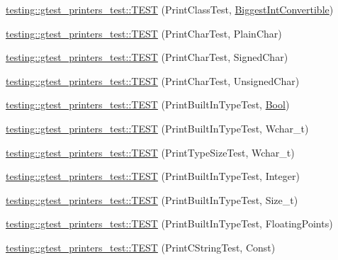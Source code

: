 \begin{DoxyCompactItemize}
\item 
\mbox{\hyperlink{namespacetesting_1_1gtest__printers__test_a46ee2873cfeb51db5f56be0960ce333b}{testing\+::gtest\+\_\+printers\+\_\+test\+::\+T\+E\+ST}} (Print\+Class\+Test, \mbox{\hyperlink{class_biggest_int_convertible}{Biggest\+Int\+Convertible}})
\item 
\mbox{\hyperlink{namespacetesting_1_1gtest__printers__test_aa0a012b88bd8dee46707bf308aa312d1}{testing\+::gtest\+\_\+printers\+\_\+test\+::\+T\+E\+ST}} (Print\+Char\+Test, Plain\+Char)
\item 
\mbox{\hyperlink{namespacetesting_1_1gtest__printers__test_a08fe11b61c0ff62931f0172dc05c971b}{testing\+::gtest\+\_\+printers\+\_\+test\+::\+T\+E\+ST}} (Print\+Char\+Test, Signed\+Char)
\item 
\mbox{\hyperlink{namespacetesting_1_1gtest__printers__test_a54554ba079349cf09dcb6d522cfb70de}{testing\+::gtest\+\_\+printers\+\_\+test\+::\+T\+E\+ST}} (Print\+Char\+Test, Unsigned\+Char)
\item 
\mbox{\hyperlink{namespacetesting_1_1gtest__printers__test_a6f08c464dc0b8eb822368f552d4467ad}{testing\+::gtest\+\_\+printers\+\_\+test\+::\+T\+E\+ST}} (Print\+Built\+In\+Type\+Test, \mbox{\hyperlink{struct_bool}{Bool}})
\item 
\mbox{\hyperlink{namespacetesting_1_1gtest__printers__test_ab567ebd97eff0a4b9a20a5f5cb77d678}{testing\+::gtest\+\_\+printers\+\_\+test\+::\+T\+E\+ST}} (Print\+Built\+In\+Type\+Test, Wchar\+\_\+t)
\item 
\mbox{\hyperlink{namespacetesting_1_1gtest__printers__test_a705ec4c2886606a22194107397fceea6}{testing\+::gtest\+\_\+printers\+\_\+test\+::\+T\+E\+ST}} (Print\+Type\+Size\+Test, Wchar\+\_\+t)
\item 
\mbox{\hyperlink{namespacetesting_1_1gtest__printers__test_a278d53e99390c7b31ff531524fe5e86e}{testing\+::gtest\+\_\+printers\+\_\+test\+::\+T\+E\+ST}} (Print\+Built\+In\+Type\+Test, Integer)
\item 
\mbox{\hyperlink{namespacetesting_1_1gtest__printers__test_a991dc124d153742c3ca126b2fa9ccab5}{testing\+::gtest\+\_\+printers\+\_\+test\+::\+T\+E\+ST}} (Print\+Built\+In\+Type\+Test, Size\+\_\+t)
\item 
\mbox{\hyperlink{namespacetesting_1_1gtest__printers__test_acde0b28d177604ddb5e185d7b107f6f7}{testing\+::gtest\+\_\+printers\+\_\+test\+::\+T\+E\+ST}} (Print\+Built\+In\+Type\+Test, Floating\+Points)
\item 
\mbox{\hyperlink{namespacetesting_1_1gtest__printers__test_a6cd47b21ad8d9ac66ba57b5b6415a924}{testing\+::gtest\+\_\+printers\+\_\+test\+::\+T\+E\+ST}} (Print\+C\+String\+Test, Const)

\end{DoxyCompactItemize}
